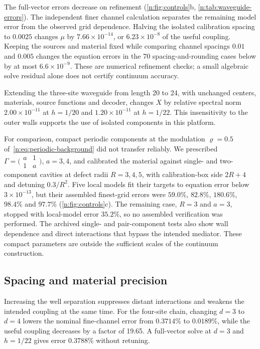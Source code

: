 The full-vector errors decrease on refinement (\cref{n:fig:controls}b,
\cref{n:tab:waveguide-errors}). The independent finer channel calculation
separates the remaining model error from the observed grid dependence.
Halving the isolated calibration spacing to $0.0025$ changes $\mu$ by
$7.66\times10^{-14}$, or $6.23\times10^{-8}$ of the useful coupling. Keeping
the sources and material fixed while comparing channel spacings $0.01$ and
$0.005$ changes the equation errors in the 70 spacing-and-rounding cases
below by at most $6.6\times10^{-9}$. These are numerical refinement checks;
a small algebraic solve residual alone does not certify continuum accuracy.

Extending the three-site waveguide from length 20 to 24, with unchanged
centers, materials, source functions and decoder, changes $X$ by relative
spectral norm $2.00\times10^{-11}$ at $h=1/20$ and $1.20\times10^{-11}$ at
$h=1/22$. This insensitivity to the outer walls supports the use of isolated
components in this platform.

For comparison, compact periodic components at the modulation
$\varrho=0.5$ of~\eqref{n:eq:periodic-background} did not transfer reliably.
We prescribed $\Gamma=\bigl(\begin{smallmatrix}a&1\\1&a\end{smallmatrix}\bigr)$,
$a=3,4$, and calibrated the material against single- and two-component
cavities at defect radii $R=3,4,5$, with calibration-box side $2R+4$ and
detuning $0.3/R^2$. Five local models fit their targets to
equation error below $3\times10^{-13}$, but their assembled finest-grid
errors were $59.0\%$, $82.8\%$, $180.6\%$, $98.4\%$ and $97.7\%$
(\cref{n:fig:controls}c). The remaining case, $R=3$ and $a=3$, stopped with
local-model error $35.2\%$, so no assembled verification was performed.
The archived single- and pair-component tests also show wall dependence and
direct interactions that bypass the intended mediator. These compact
parameters are outside the sufficient scales of the continuum construction.



\subsection{Spacing and material precision}

Increasing the well separation suppresses distant interactions and weakens
the intended coupling at the same time. For the four-site chain, changing
$d=3$ to $d=4$ lowers the nominal fine-channel error from $0.3714\%$ to
$0.0189\%$, while the useful coupling decreases by a factor of 19.65. A
full-vector solve at $d=3$ and $h=1/22$ gives error $0.3788\%$ without
retuning.

